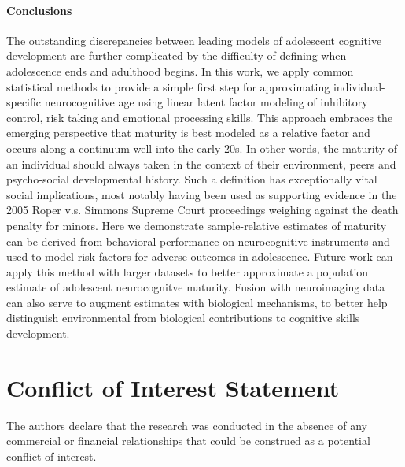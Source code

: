 \documentclass[utf8]{frontiersSCNS} %
\begin{document}
\paragraph*{Conclusions}The outstanding discrepancies between leading models of adolescent cognitive development are further complicated by the difficulty of defining when adolescence ends and adulthood begins. In this work, we apply common statistical methods to provide a simple first step for approximating individual-specific neurocognitive age using linear latent factor modeling of inhibitory control, risk taking and emotional processing skills. This approach embraces the emerging perspective that maturity is best modeled as a relative factor and occurs along a continuum well into the early 20s. In other words, the maturity of an individual should always taken in the context of their environment, peers and psycho-social developmental history. Such a definition has exceptionally vital social implications, most notably having been used as supporting evidence in the 2005 Roper v.s. Simmons Supreme Court proceedings weighing against the death penalty for minors. Here we demonstrate sample-relative estimates of maturity can be derived from behavioral performance on neurocognitive instruments and used to model risk factors for adverse outcomes in adolescence. Future work can apply this method with larger datasets to better approximate a population estimate of adolescent neurocognitve maturity. Fusion with neuroimaging data can also serve to augment estimates with biological mechanisms, to better help distinguish environmental from biological contributions to cognitive skills development.




\section*{Conflict of Interest Statement}
The authors declare that the research was conducted in the absence of any commercial or financial relationships that could be construed as a potential conflict of interest.
\end{document}
